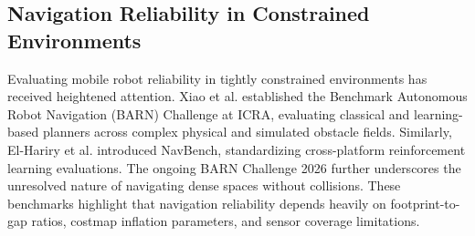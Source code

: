 \documentclass[conference]{IEEEtran}
\begin{document}
\subsection{Navigation Reliability in Constrained Environments}
Evaluating mobile robot reliability in tightly constrained environments has received heightened attention. Xiao et al. \cite{Xiao2022barn} established the Benchmark Autonomous Robot Navigation (BARN) Challenge at ICRA, evaluating classical and learning-based planners across complex physical and simulated obstacle fields. Similarly, El-Hariry et al. \cite{ElHariry2025navbench} introduced NavBench, standardizing cross-platform reinforcement learning evaluations. The ongoing BARN Challenge 2026 \cite{Xiao2026barn} further underscores the unresolved nature of navigating dense spaces without collisions. These benchmarks highlight that navigation reliability depends heavily on footprint-to-gap ratios, costmap inflation parameters, and sensor coverage limitations.
\end{document}
